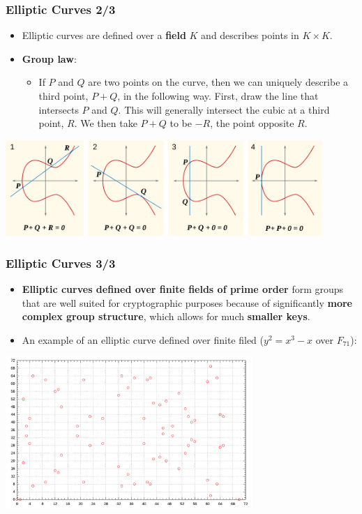 \documentclass{beamer}
\begin{document}
\begin{frame}
  \frametitle{Elliptic Curves 2/3}
  \begin{itemize}
  \item Elliptic curves are defined over a \textbf{field} $K$ and describes
    points in $K \times K$.
  \item \textbf{Group law}:
    \begin{itemize}
    \item If $P$ and $Q$ are two points on the curve, then we can uniquely
      describe a third point, $P + Q$, in the following way. First, draw the
      line that intersects $P$ and $Q$. This will generally intersect the cubic
      at a third point, $R$. We then take $P + Q$ to be $-R$, the point opposite
      $R$.
    \end{itemize}
  \end{itemize}
  \begin{center}
    \includegraphics[width=0.9\textwidth]{ec_group}
  \end{center}
\end{frame}

\begin{frame}
  \frametitle{Elliptic Curves 3/3}
  \begin{itemize}
  \item \textbf{Elliptic curves defined over finite fields of prime order} form
    groups that are well suited for cryptographic purposes because of
    significantly \textbf{more complex group structure}, which allows for much
    \textbf{smaller keys}.
  \item An example of an elliptic curve defined over finite filed ($y^2 = x
    ^3 - x$ over $F_{71}$):
  \end{itemize}
  \begin{center}
    \includegraphics[width=0.7\textwidth]{ec_finite_field_group}
  \end{center}
\end{frame}
\end{document}

